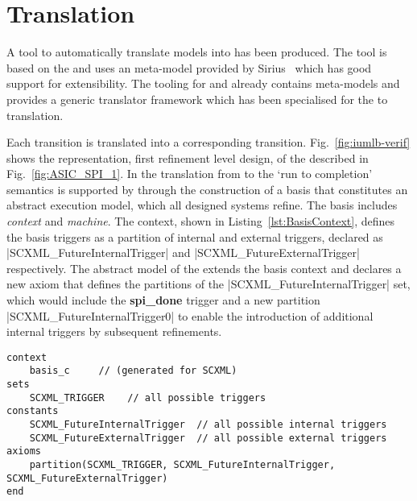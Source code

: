 
\section{\SCXML Translation}
\label{sec:translation}

A tool to automatically translate \SCXML models into \iUMLB has been produced. 
The tool is based on the \EMF and uses an \SCXML meta-model provided by Sirius~\cite{siriuswebsite} which has good support for extensibility. 
The tooling for \iUMLB and \EventB already contains \EMF meta-models and provides a generic translator framework which has been specialised for the \SCXML to \iUMLB translation. 

Each \SCXML transition is translated into a corresponding \iUMLB transition. 
Fig.~\ref{fig:iumlb-verif} shows the \iUMLB representation, first refinement level design, of the \IDS described in
Fig.~\ref{fig:ASIC_SPI_1}. 
In the translation from \iUMLB to \EventB the `run to completion' semantics is supported by \EventB through the construction of a basis that constitutes an abstract execution model, which all designed systems refine. 
The basis includes \EventB \emph{context} and \emph{machine}. 
The context, shown in Listing~\ref{lst:BasisContext}, defines the basis triggers as a partition of internal and external triggers, declared as |SCXML_FutureInternalTrigger| and |SCXML_FutureExternalTrigger| respectively. 
The abstract model of the \IDS extends the basis context and declares a new axiom that defines the partitions of the |SCXML_FutureInternalTrigger| set, which would include the \textbf{spi\_done} trigger and a new partition |SCXML_FutureInternalTrigger0| to enable the introduction of additional internal triggers by subsequent refinements. 

\begin{lstlisting}[caption={Abstract basis context},label={lst:BasisContext}, language=Event-B, escapechar=|, frame=single]
context
	basis_c 	// (generated for SCXML)
sets
	SCXML_TRIGGER	 // all possible triggers
constants
	SCXML_FutureInternalTrigger	 // all possible internal triggers
	SCXML_FutureExternalTrigger	 // all possible external triggers  
axioms
	partition(SCXML_TRIGGER, SCXML_FutureInternalTrigger, SCXML_FutureExternalTrigger) 
end
\end{lstlisting}	


